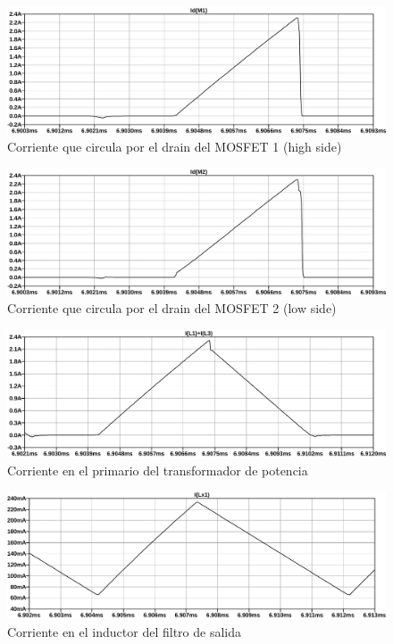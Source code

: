 \begin{figure}[ht]
    \centering
    \includegraphics[width=\textwidth]{images/sim/10.pdf}
    \caption{Corriente que circula por el drain del MOSFET 1 (high side)}
    \label{fig:sim:10}
\end{figure}

\begin{figure}[ht]
    \centering
    \includegraphics[width=\textwidth]{images/sim/11.pdf}
    \caption{Corriente que circula por el drain del MOSFET 2 (low side)}
    \label{fig:sim:11}
\end{figure}

\begin{figure}[ht]
    \centering
    \includegraphics[width=\textwidth]{images/sim/12.pdf}
    \caption{Corriente en el primario del transformador de potencia}
    \label{fig:sim:12}
\end{figure}

\begin{figure}[ht]
    \centering
    \includegraphics[width=\textwidth]{images/sim/13.pdf}
    \caption{Corriente en el inductor del filtro de salida}
    \label{fig:sim:13}
\end{figure}

